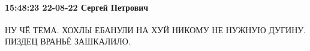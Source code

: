  
 
 
 
 

\paragraph{15:48:23 22-08-22 Сергей Петрович}
НУ ЧЁ ТЕМА.
ХОХЛЫ ЕБАНУЛИ НА ХУЙ НИКОМУ НЕ НУЖНУЮ ДУГИНУ.
ПИЗДЕЦ ВРАНЬЁ ЗАШКАЛИЛО.
